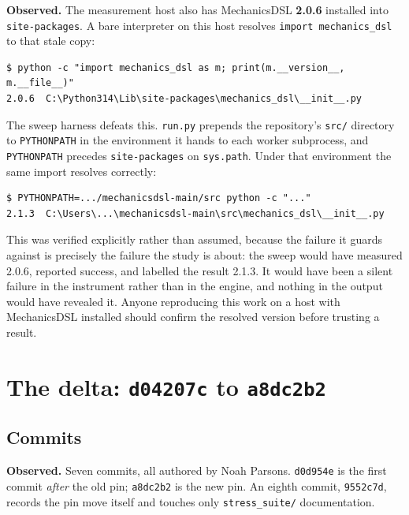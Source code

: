 \documentclass[11pt,a4paper]{article}
\newcommand{\gitsha}[1]{\texttt{#1}}
\begin{document}
\noindent\textbf{Observed.} The measurement host also has MechanicsDSL
\textbf{2.0.6} installed into \texttt{site-packages}. A bare interpreter on
this host resolves \texttt{import mechanics\_dsl} to that stale copy:

\begin{lstlisting}
$ python -c "import mechanics_dsl as m; print(m.__version__, m.__file__)"
2.0.6  C:\Python314\Lib\site-packages\mechanics_dsl\__init__.py
\end{lstlisting}

The sweep harness defeats this. \texttt{run.py} prepends the repository's
\texttt{src/} directory to \texttt{PYTHONPATH} in the environment it hands to
each worker subprocess, and \texttt{PYTHONPATH} precedes \texttt{site-packages}
on \texttt{sys.path}. Under that environment the same import resolves
correctly:

\begin{lstlisting}
$ PYTHONPATH=.../mechanicsdsl-main/src python -c "..."
2.1.3  C:\Users\...\mechanicsdsl-main\src\mechanics_dsl\__init__.py
\end{lstlisting}

\noindent This was verified explicitly rather than assumed, because the failure
it guards against is precisely the failure the study is about: the sweep would
have measured 2.0.6, reported success, and labelled the result 2.1.3. It would
have been a silent failure in the instrument rather than in the engine, and
nothing in the output would have revealed it. Anyone reproducing this work on a
host with MechanicsDSL installed should confirm the resolved version before
trusting a result.

\section{The delta: \gitsha{d04207c} to \gitsha{a8dc2b2}}\label{sec:delta}

\subsection{Commits}

\noindent\textbf{Observed.} Seven commits, all authored by Noah Parsons.
\gitsha{d0d954e} is the first commit \emph{after} the old pin;
\gitsha{a8dc2b2} is the new pin. An eighth commit, \gitsha{9552c7d}, records
the pin move itself and touches only \texttt{stress\_suite/} documentation.
\end{document}
